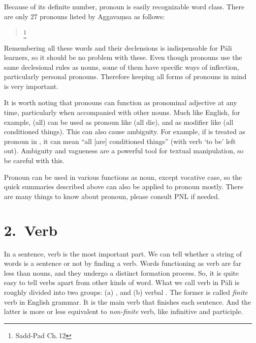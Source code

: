 Because of its definite number, pronoun is easily recognizable word class. There are only 27 pronouns listed by Aggava\d msa as follows:

\begin{quote}
\footnote{Sadd-Pad Ch.\,12}
\end{quote}

Remembering all these words and their declensions is indispensable for P\=ali learners, so it should be no problem with these. Even though pronouns use the same declesional rules as nouns, some of them have specific ways of inflection, particularly personal pronouns. Therefore keeping all forms of pronouns in mind is very important.

It is worth noting that pronouns can function as pronominal adjective at any time, particularly when accompanied with other nouns. Much like English, for example,  (all) can be used as pronoun like  (all die), and as modifier like  (all conditioned things). This can also cause ambiguity. For example, if  is treated as pronoun in , it can mean ``all [are] conditioned things'' (with verb `to be' left out). Ambiguity and vagueness are a powerful tool for textual manipulation, so be careful with this.

Pronoun can be used in various functions as noun, except vocative case, so the quick summaries described above can also be applied to pronoun mostly. There are many things to know about pronoun, please consult PNL if needed.

{}
\section*{2.\ Verb}

In a sentence, verb is the most important part. We can tell whether a string of words is a sentence or not by finding a verb. Words functioning as verb are far less than nouns, and they undergo a distinct formation process. So, it is quite easy to tell verbs apart from other kinds of word. What we call verb in P\=ali is roughly divided into two groups: (a) , and (b) verbal . The former is called \emph{finite} verb in English grammar. It is the main verb that finishes each sentence. And the latter is more or less equivalent to \emph{non-finite} verb, like infinitive and participle.

